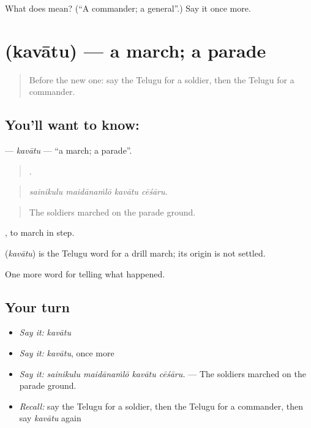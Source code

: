 \begin{tcolorbox}[breakable,colback=teal!4,colframe=teal!35!black,title={Before you move on}]
What does  mean? (\textquotedblleft{}A commander; a general\textquotedblright{}.) Say it once more.
\end{tcolorbox}
\section[\texorpdfstring{\te{కవాతు} (kavātu)}{కవాతు (kavātu)}]{ (kavātu) — a march; a parade}

\label{lesson:TE-C339-kavatu}



\begin{quote}
Before the new one: say the Telugu for a soldier, then the Telugu for a commander.
\end{quote}

\subsection*{You'll want to know: }
\textbf{} — \emph{kavātu} — \textquotedblleft{}a march; a parade\textquotedblright{}.

\begin{quote}
   .
\end{quote}

\begin{quote}
\emph{sainikulu maidānaṁlō kavātu cēśāru.}
\end{quote}

\begin{quote}
The soldiers marched on the parade ground.
\end{quote}

 , to march in step.

\begin{cousinweb}
\textbf{} (\emph{kavātu}) is the Telugu word for a drill march; its origin is not settled.
\end{cousinweb}

\begin{grammarlens}[title={What you've built}]
One more word for telling what happened.
\end{grammarlens}

\subsection*{Your turn}
\begin{itemize}
\raggedright
  \item \emph{Say it:} \emph{kavātu}
  \item \emph{Say it:} \emph{kavātu}, once more
  \item \emph{Say it:} \emph{sainikulu maidānaṁlō kavātu cēśāru.} — The soldiers marched on the parade ground.
  \item \emph{Recall:} say the Telugu for a soldier, then the Telugu for a commander, then say \emph{kavātu} again
\end{itemize}

